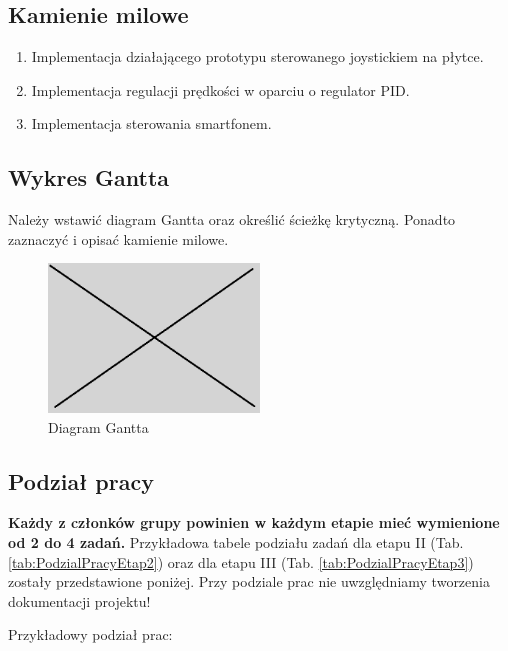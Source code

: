 \documentclass[10pt, a4paper]{article}
\begin{document}
\subsection{Kamienie milowe}
	\begin{enumerate}
		\item Implementacja działającego prototypu sterowanego joystickiem na płytce.
		\item Implementacja regulacji prędkości w oparciu o regulator PID.
		\item Implementacja sterowania smartfonem.
	\end{enumerate}

\subsection{Wykres Gantta}
Należy wstawić diagram Gantta oraz określić ścieżkę 
krytyczną. Ponadto zaznaczyć i opisać kamienie milowe.

\begin{figure}[H]
	\centering
	\includegraphics[width=0.5\textwidth]{figures/obraz.png}
	\caption{Diagram Gantta}
	\label{fig:DiagramGantta}
\end{figure}

\subsection{Podział pracy}

\textbf{Każdy z członków grupy powinien w każdym etapie mieć wymienione od 2 do 4 zadań.}
Przykładowa tabele podziału zadań dla etapu II 
(Tab. \ref{tab:PodzialPracyEtap2}) oraz dla etapu III 
(Tab. \ref{tab:PodzialPracyEtap3})
zostały przedstawione poniżej. 
Przy podziale prac nie uwzględniamy tworzenia dokumentacji projektu!

Przykładowy podział prac:
\end{document}
